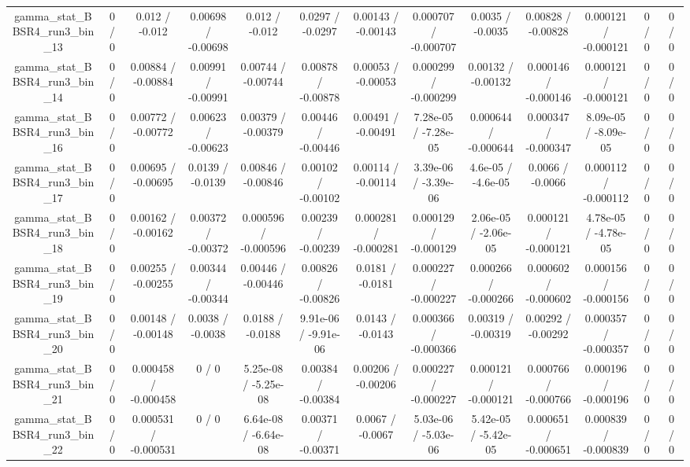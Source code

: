 \documentclass[10pt]{article}
\begin{document}
\begin{table}[htbp]
\begin{center}
\begin{tabular}{|c|c|c|c|c|c|c|c|c|c|c|c|c|}
  gamma_stat_BBSR4_run3_bin_13 & 0 / 0 & 0.012 / -0.012 & 0.00698 / -0.00698 & 0.012 / -0.012 & 0.0297 / -0.0297 & 0.00143 / -0.00143 & 0.000707 / -0.000707 & 0.0035 / -0.0035 & 0.00828 / -0.00828 & 0.000121 / -0.000121 & 0 / 0 & 0 / 0 \\ 
  gamma_stat_BBSR4_run3_bin_14 & 0 / 0 & 0.00884 / -0.00884 & 0.00991 / -0.00991 & 0.00744 / -0.00744 & 0.00878 / -0.00878 & 0.00053 / -0.00053 & 0.000299 / -0.000299 & 0.00132 / -0.00132 & 0.000146 / -0.000146 & 0.000121 / -0.000121 & 0 / 0 & 0 / 0 \\ 
  gamma_stat_BBSR4_run3_bin_16 & 0 / 0 & 0.00772 / -0.00772 & 0.00623 / -0.00623 & 0.00379 / -0.00379 & 0.00446 / -0.00446 & 0.00491 / -0.00491 & 7.28e-05 / -7.28e-05 & 0.000644 / -0.000644 & 0.000347 / -0.000347 & 8.09e-05 / -8.09e-05 & 0 / 0 & 0 / 0 \\ 
  gamma_stat_BBSR4_run3_bin_17 & 0 / 0 & 0.00695 / -0.00695 & 0.0139 / -0.0139 & 0.00846 / -0.00846 & 0.00102 / -0.00102 & 0.00114 / -0.00114 & 3.39e-06 / -3.39e-06 & 4.6e-05 / -4.6e-05 & 0.0066 / -0.0066 & 0.000112 / -0.000112 & 0 / 0 & 0 / 0 \\ 
  gamma_stat_BBSR4_run3_bin_18 & 0 / 0 & 0.00162 / -0.00162 & 0.00372 / -0.00372 & 0.000596 / -0.000596 & 0.00239 / -0.00239 & 0.000281 / -0.000281 & 0.000129 / -0.000129 & 2.06e-05 / -2.06e-05 & 0.000121 / -0.000121 & 4.78e-05 / -4.78e-05 & 0 / 0 & 0 / 0 \\ 
  gamma_stat_BBSR4_run3_bin_19 & 0 / 0 & 0.00255 / -0.00255 & 0.00344 / -0.00344 & 0.00446 / -0.00446 & 0.00826 / -0.00826 & 0.0181 / -0.0181 & 0.000227 / -0.000227 & 0.000266 / -0.000266 & 0.000602 / -0.000602 & 0.000156 / -0.000156 & 0 / 0 & 0 / 0 \\ 
  gamma_stat_BBSR4_run3_bin_20 & 0 / 0 & 0.00148 / -0.00148 & 0.0038 / -0.0038 & 0.0188 / -0.0188 & 9.91e-06 / -9.91e-06 & 0.0143 / -0.0143 & 0.000366 / -0.000366 & 0.00319 / -0.00319 & 0.00292 / -0.00292 & 0.000357 / -0.000357 & 0 / 0 & 0 / 0 \\ 
  gamma_stat_BBSR4_run3_bin_21 & 0 / 0 & 0.000458 / -0.000458 & 0 / 0 & 5.25e-08 / -5.25e-08 & 0.00384 / -0.00384 & 0.00206 / -0.00206 & 0.000227 / -0.000227 & 0.000121 / -0.000121 & 0.000766 / -0.000766 & 0.000196 / -0.000196 & 0 / 0 & 0 / 0 \\ 
  gamma_stat_BBSR4_run3_bin_22 & 0 / 0 & 0.000531 / -0.000531 & 0 / 0 & 6.64e-08 / -6.64e-08 & 0.00371 / -0.00371 & 0.0067 / -0.0067 & 5.03e-06 / -5.03e-06 & 5.42e-05 / -5.42e-05 & 0.000651 / -0.000651 & 0.000839 / -0.000839 & 0 / 0 & 0 / 0 \\ 

\end{tabular}
\end{center}
\end{table}
\end{document}
